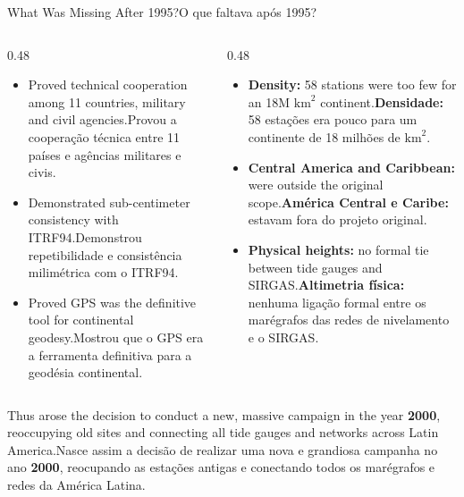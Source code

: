 \documentclass[aspectratio=169,11pt]{beamer}
\newcommand{\tr}[2]{\ifEN#2\else#1\fi}
\begin{document}
\begin{frame}{\tr{O que faltava após 1995?}{What Was Missing After 1995?}}
  \begin{columns}[onlytextwidth]
    \begin{column}{0.48\textwidth}
      \begin{tcolorbox}[colback=mTeal!8, colframe=mTeal, title={\tr{O que deu certo em 1995}{What worked in 1995}}]
        \scriptsize
        \begin{itemize}
          \setlength{\itemsep}{2pt}
          \item \tr{Provou a cooperação técnica entre 11 países e agências militares e civis.}{Proved technical cooperation among 11 countries, military and civil agencies.}
          \item \tr{Demonstrou repetibilidade e consistência milimétrica com o ITRF94.}{Demonstrated sub-centimeter consistency with ITRF94.}
          \item \tr{Mostrou que o GPS era a ferramenta definitiva para a geodésia continental.}{Proved GPS was the definitive tool for continental geodesy.}
        \end{itemize}
      \end{tcolorbox}
    \end{column}
    \begin{column}{0.48\textwidth}
      \begin{tcolorbox}[colback=mAmber!8, colframe=mAmber, title={\tr{O que ainda faltava}{What was still missing}}]
        \scriptsize
        \begin{itemize}
          \setlength{\itemsep}{2pt}
          \item \tr{\textbf{Densidade:} \num{58} estações era pouco para um continente de \num{18} milhões de $\mathrm{km}^2$.}{\textbf{Density:} \num{58} stations were too few for an \num{18}M $\mathrm{km}^2$ continent.}
          \item \tr{\textbf{América Central e Caribe:} estavam fora do projeto original.}{\textbf{Central America and Caribbean:} were outside the original scope.}
          \item \tr{\textbf{Altimetria física:} nenhuma ligação formal entre os marégrafos das redes de nivelamento e o SIRGAS.}{\textbf{Physical heights:} no formal tie between tide gauges and SIRGAS.}
        \end{itemize}
      \end{tcolorbox}
    \end{column}
  \end{columns}
  \vspace{0.25cm}
  \begin{ideia}
    \scriptsize \tr{Nasce assim a decisão de realizar uma nova e grandiosa campanha no ano \textbf{2000},
    reocupando as estações antigas e conectando todos os marégrafos e redes da América Latina.}{Thus
    arose the decision to conduct a new, massive campaign in the year \textbf{2000}, reoccupying old
    sites and connecting all tide gauges and networks across Latin America.}
  \end{ideia}
\end{frame}
\end{document}
